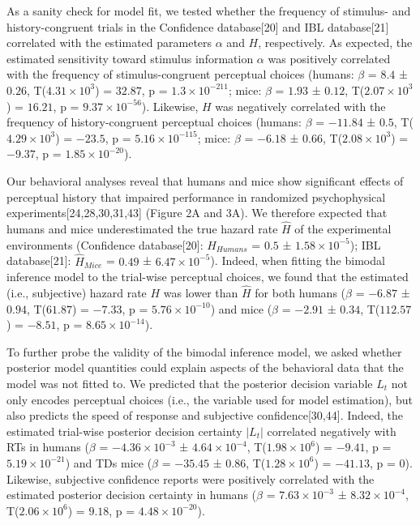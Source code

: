 \documentclass[
]{article}
\begin{document}
As a sanity check for model fit, we tested whether the frequency of
stimulus- and history-congruent trials in the Confidence
database{[}20{]} and IBL database{[}21{]} correlated with the estimated
parameters \(\alpha\) and \(H\), respectively. As expected, the
estimated sensitivity toward stimulus information \(\alpha\) was
positively correlated with the frequency of stimulus-congruent
perceptual choices (humans: \(\beta\) = \(8.4\) ± \(0.26\),
T(\(\ensuremath{4.31\times 10^{3}}\)) = \(32.87\), p =
\(\ensuremath{1.3\times 10^{-211}}\); mice: \(\beta\) = \(1.93\) ±
\(0.12\), T(\(\ensuremath{2.07\times 10^{3}}\)) = \(16.21\), p =
\(\ensuremath{9.37\times 10^{-56}}\)). Likewise, \(H\) was negatively
correlated with the frequency of history-congruent perceptual choices
(humans: \(\beta\) = \(-11.84\) ± \(0.5\),
T(\(\ensuremath{4.29\times 10^{3}}\)) = \(-23.5\), p =
\(\ensuremath{5.16\times 10^{-115}}\); mice: \(\beta\) = \(-6.18\) ±
\(0.66\), T(\(\ensuremath{2.08\times 10^{3}}\)) = \(-9.37\), p =
\(\ensuremath{1.85\times 10^{-20}}\)).

Our behavioral analyses reveal that humans and mice show significant
effects of perceptual history that impaired performance in randomized
psychophysical experiments{[}24,28,30,31,43{]} (Figure 2A and 3A). We
therefore expected that humans and mice underestimated the true hazard
rate \(\hat{H}\) of the experimental environments (Confidence
database{[}20{]}: \(\hat{H}_{Humans}\) = \(0.5\) ±
\(\ensuremath{1.58\times 10^{-5}}\)); IBL database{[}21{]}:
\(\hat{H}_{Mice}\) = \(0.49\) ± \(\ensuremath{6.47\times 10^{-5}}\)).
Indeed, when fitting the bimodal inference model to the trial-wise
perceptual choices, we found that the estimated (i.e., subjective)
hazard rate \(H\) was lower than \(\hat{H}\) for both humans (\(\beta\)
= \(-6.87\) ± \(0.94\), T(\(61.87\)) = \(-7.33\), p =
\(\ensuremath{5.76\times 10^{-10}}\)) and mice (\(\beta\) = \(-2.91\) ±
\(0.34\), T(\(112.57\)) = \(-8.51\), p =
\(\ensuremath{8.65\times 10^{-14}}\)).

To further probe the validity of the bimodal inference model, we asked
whether posterior model quantities could explain aspects of the
behavioral data that the model was not fitted to. We predicted that the
posterior decision variable \(L_t\) not only encodes perceptual choices
(i.e., the variable used for model estimation), but also predicts the
speed of response and subjective confidence{[}30,44{]}. Indeed, the
estimated trial-wise posterior decision certainty \(|L_t|\) correlated
negatively with RTs in humans (\(\beta\) =
\(\ensuremath{-4.36\times 10^{-3}}\) ±
\(\ensuremath{4.64\times 10^{-4}}\),
T(\(\ensuremath{1.98\times 10^{6}}\)) = \(-9.41\), p =
\(\ensuremath{5.19\times 10^{-21}}\)) and TDs mice (\(\beta\) =
\(-35.45\) ± \(0.86\), T(\(\ensuremath{1.28\times 10^{6}}\)) =
\(-41.13\), p = \(0\)). Likewise, subjective confidence reports were
positively correlated with the estimated posterior decision certainty in
humans (\(\beta\) = \(\ensuremath{7.63\times 10^{-3}}\) ±
\(\ensuremath{8.32\times 10^{-4}}\),
T(\(\ensuremath{2.06\times 10^{6}}\)) = \(9.18\), p =
\(\ensuremath{4.48\times 10^{-20}}\)).
\end{document}
